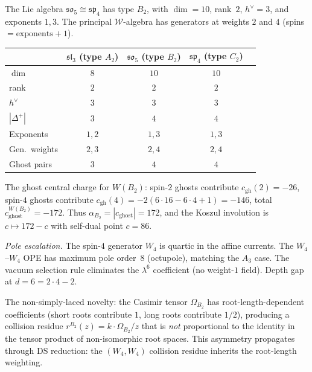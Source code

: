 \begin{computation}
\label{comp:wB2-ds-data}
%
%
The Lie algebra $\mathfrak{so}_5 \cong \mathfrak{sp}_4$
has type $B_2$, with $\dim = 10$, rank~$2$,
$h^\vee = 3$, and exponents $1, 3$. The principal
$\mathcal{W}$-algebra has generators at weights $2$ and $4$
\textup{(}spins $= \text{exponents} + 1$\textup{)}.

\begin{center}
\small
\renewcommand{\arraystretch}{1.3}
\begin{tabular}{lcccc}
\toprule
& \textbf{$\mathfrak{sl}_3$ (type $A_2$)}
& \textbf{$\mathfrak{so}_5$ (type $B_2$)}
& \textbf{$\mathfrak{sp}_4$ (type $C_2$)} \\
\midrule
$\dim$ & $8$ & $10$ & $10$ \\
rank & $2$ & $2$ & $2$ \\
$h^\vee$ & $3$ & $3$ & $3$ \\
$|\Delta^+|$ & $3$ & $4$ & $4$ \\
Exponents & $1, 2$ & $1, 3$ & $1, 3$ \\
Gen.\ weights & $2, 3$ & $2, 4$ & $2, 4$ \\
Ghost pairs & $3$ & $4$ & $4$ \\
\bottomrule
\end{tabular}
\end{center}

\noindent
The ghost central charge for $W(B_2)$: spin-$2$ ghosts
contribute $c_{\mathrm{gh}}(2) = -26$, spin-$4$ ghosts contribute
$c_{\mathrm{gh}}(4) = -2(6 \cdot 16 - 6 \cdot 4 + 1) = -146$,
total $c_{\mathrm{ghost}}^{W(B_2)} = -172$. Thus
$\alpha_{B_2} = |c_{\mathrm{ghost}}| = 172$, and the Koszul
involution is $c \mapsto 172 - c$ with self-dual point
$c = 86$.

\emph{Pole escalation.}
The spin-$4$ generator $W_4$ is quartic in the affine
currents. The $W_4$--$W_4$ OPE has maximum pole
order~$8$ (octupole), matching the $A_3$ case. The vacuum
selection rule eliminates the $\lambda^6$ coefficient (no
weight-$1$ field). Depth gap at $d = 6 = 2 \cdot 4 - 2$.

The non-simply-laced novelty: the Casimir tensor
$\Omega_{B_2}$ has root-length-dependent coefficients (short
roots contribute $1$, long roots contribute $1/2$), producing a
collision residue $r^{B_2}(z) = k \cdot \Omega_{B_2}/z$ that
is \emph{not} proportional to the identity in the tensor product
of non-isomorphic root spaces. This asymmetry propagates
through DS reduction: the $(W_4, W_4)$ collision residue
inherits the root-length weighting.
\end{computation}

